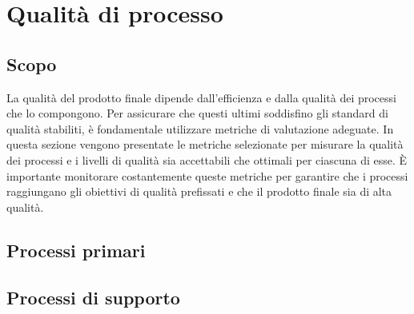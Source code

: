 \section{Qualità di processo}
    \subsection{Scopo}
    La qualità del prodotto finale dipende dall'efficienza e dalla qualità dei 
    processi che lo compongono. Per assicurare che questi ultimi soddisfino gli 
    standard di qualità stabiliti, è fondamentale utilizzare metriche di valutazione 
    adeguate. In questa sezione vengono presentate le metriche selezionate per 
    misurare la qualità dei processi e i livelli di qualità sia accettabili che 
    ottimali per ciascuna di esse. È importante monitorare costantemente queste 
    metriche per garantire che i processi raggiungano gli obiettivi di qualità 
    prefissati e che il prodotto finale sia di alta qualità.
    \subsection{Processi primari}
    \subsection{Processi di supporto}

